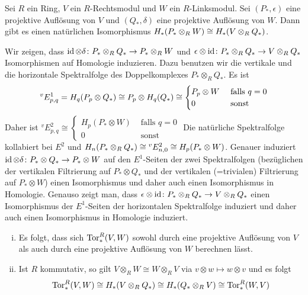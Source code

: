 \begin{satz}
	Sei $R$ ein Ring, $V$ ein $R$-Rechtsmodul und $W$ ein $R$-Linksmodul.
	Sei $(P_*,\epsilon)$ eine projektive Auflösung von $V$ und $(Q_*,\delta)$ eine projektive Auflösung von $W$.
	Dann gibt es einen natürlichen Isomorphismus $H_* \enbrace*{P_* \otimes_R W} \cong H_* \enbrace*{V \otimes_R Q_*}$.
\end{satz}
\begin{beweis}
	Wir zeigen, dass $\operatorname{id} \otimes \delta \colon P_* \otimes_R Q_* \to P_* \otimes_R W$ und $\epsilon \otimes \operatorname{id} \colon P_* \otimes_R Q_* \to V \otimes_R Q_*$ Isomorphismen auf Homologie induzieren.
	Dazu benutzen wir die vertikale und die horizontale Spektralfolge des Doppelkomplexes $P_* \otimes_R Q_*$.
	Es ist 
	\[
		^v E^1_{p,q} = H_q \enbrace*{P_p \otimes Q_*} \cong P_p \otimes H_q(Q_*) \cong \begin{cases}
			P_p \otimes W &\text{ falls }q=0\\
			0 &\text{ sonst }
		\end{cases}
	\]
	Daher ist $^v E^2_{p,q}\cong \begin{cases}
		H_p(P_*\otimes W) &\text{ falls }q=0\\
		0 &\text{ sonst }
	\end{cases}$
	Die natürliche Spektralfolge kollabiert bei $E^2$ und $H_n \enbrace*{P_* \otimes_R Q_*} \cong {^v E^2_{n,0}} \cong H_p (P_* \otimes W)$.
	Genauer induziert $\operatorname{id} \otimes \delta \colon P_* \otimes Q_* \to P_* \otimes W$ auf den $E^1$-Seiten der zwei Spektralfolgen (bezüglichen der vertikalen Filtrierung auf $P_* \otimes Q_*$ und der vertikalen (=trivialen) Filtrierung auf $P_* \otimes W$) einen Isomorphismus und daher auch einen Isomorphismus in Homologie.
	Genauso zeigt man, dass $\epsilon \otimes \operatorname{id} \colon P_* \otimes_R Q_* \to V \otimes_R Q_*$ einen Isomorphismus der $E^1$-Seiten der horizontalen Spektralfolge induziert und daher auch einen Isomorphismus in Homologie induziert.
\end{beweis}

\begin{bemerkung}
	\leavevmode
	\begin{enumerate}[(i)]
		\item Es folgt, dass sich $\operatorname{Tor}_*^R(V,W)$ sowohl durch eine projektive Auflösung von $V$ als auch durch eine projektive Auflösung von $W$ berechnen lässt.
		\item Ist $R$ kommutativ, so gilt $V \otimes_R W \cong W \otimes_R V$ via $v \otimes w \mapsto w \otimes v$ und es folgt 
		\[
			\Tor_*^R(V,W) \cong H_*\enbrace*{V \otimes_R Q_*} \cong H_* \enbrace*{Q_* \otimes_R V} \cong \Tor_*^R(W,V)
		\]
	\end{enumerate}
\end{bemerkung}


